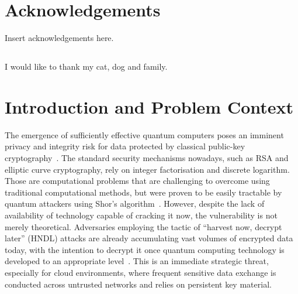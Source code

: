 \documentclass[12pt,a4paper]{article}
\begin{document}


\pagebreak

\pagebreak

\begin{abstract}
abstract
\end{abstract}
\pagebreak

\tableofcontents
\newpage

\listoftables
\newpage

\listoffigures
\newpage

\section*{Acknowledgements}
Insert acknowledgements here.
\subsection*{}
I would like to thank my cat, dog and family.
\newpage


\section{Introduction and Problem Context}

The emergence of sufficiently effective quantum computers poses an imminent privacy and integrity risk for data protected by classical public-key cryptography~\cite{nist-fips-203-2024,nist-fips-204-2024}. The standard security mechanisms nowadays, such as RSA and elliptic curve cryptography, rely on integer factorisation and discrete logarithm. Those are computational problems that are challenging to overcome using traditional computational methods, but were proven to be easily tractable by quantum attackers using Shor's algorithm~\cite{shor1997}. However, despite the lack of availability of technology capable of cracking it now, the vulnerability is not merely theoretical. Adversaries employing the tactic of ``harvest now, decrypt later'' (HNDL) attacks are already accumulating vast volumes of encrypted data today, with the intention to decrypt it once quantum computing technology is developed to an appropriate level~\cite{sectigo-hndl-2025,hashicorp-hndl-2025}. This is an immediate strategic threat, especially for cloud environments, where frequent sensitive data exchange is conducted across untrusted networks and relies on persistent key material.
\end{document}
